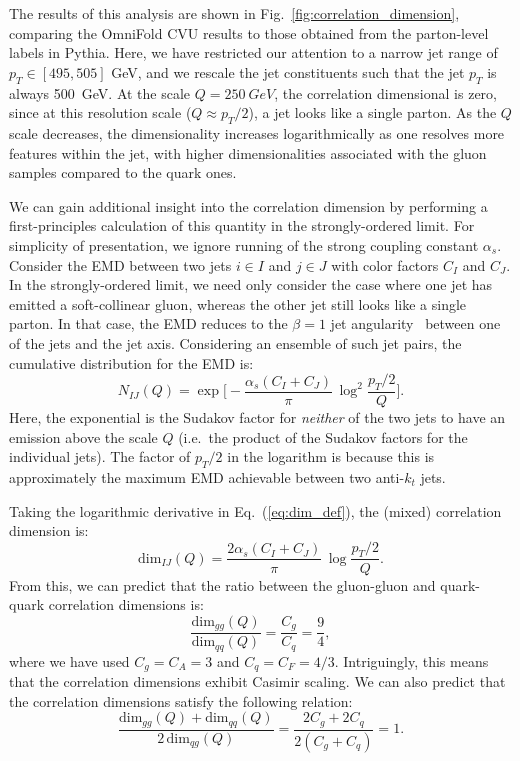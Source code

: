 \documentclass[aps,prd,twocolumn,preprintnumbers,nofootinbib,longbibliography,floatfix]{revtex4-1}
\DeclareRobustCommand{\Fig}[1]{Fig.~\ref{#1}}
\DeclareRobustCommand{\Eq}[1]{Eq.~(\ref{#1})}
\newcommand{\Pythia}{{\sc Pythia}\xspace}
\newcommand{\OmniFold}{{\sc OmniFold}\xspace}
\begin{document}
The results of this analysis are shown in \Fig{fig:correlation_dimension}, comparing the \OmniFold CVU results to those obtained from the parton-level labels in \Pythia.
%
Here, we have restricted our attention to a narrow jet range of $p_T \in [495,505]$ GeV, and we rescale the jet constituents such that the jet $p_T$ is always \SI{500}{GeV}. 
%
At the scale $Q = \SI{250}{GeV}$, the correlation dimensional is zero, since at this resolution scale ($Q \approx p_T/2$), a jet looks like a single parton.
%
As the $Q$ scale decreases, the dimensionality increases logarithmically as one resolves more features within the jet, with higher dimensionalities associated with the gluon samples compared to the quark ones.


We can gain additional insight into the correlation dimension by performing a first-principles calculation of this quantity in the strongly-ordered limit.
%
For simplicity of presentation, we ignore running of the strong coupling constant $\alpha_s$. 
%
Consider the EMD between two jets $i \in I$ and $j \in J$ with color factors $C_I$ and $C_J$.
%
In the strongly-ordered limit, we need only consider the case where one jet has emitted a soft-collinear gluon, whereas the other jet still looks like a single parton.
%
In that case, the EMD reduces to the $\beta = 1$ jet angularity~\cite{Ellis:2010rwa,Larkoski:2014uqa,Larkoski:2014pca} between one of the jets and the jet axis.
%
Considering an ensemble of such jet pairs, the cumulative distribution for the EMD is:
%
\begin{equation}
N_{IJ}(Q) = \exp \Big[- \frac{\alpha_s (C_I + C_J)}{\pi}\, \log^2 \frac{p_T/2}{Q}\Big].
\end{equation}
%
Here, the exponential is the Sudakov factor for \emph{neither} of the two jets to have an emission above the scale $Q$ (i.e.~the product of the Sudakov factors for the individual jets).
%
The factor of $p_T/ 2$ in the logarithm is because this is approximately the maximum EMD achievable between two anti-$k_t$ jets.


Taking the logarithmic derivative in \Eq{eq:dim_def}, the (mixed) correlation dimension is:
%
\begin{equation}
\label{eq:dim_QCD}
\text{dim}_{IJ}(Q) = \frac{2\alpha_s (C_I + C_J)}{\pi}\, \log \frac{p_T/2}{Q}.
\end{equation}
%
From this, we can predict that the ratio between the gluon-gluon and quark-quark correlation dimensions is:
%
\begin{equation}
\label{eq:dim_ratio}
\frac{\text{dim}_{gg}(Q)}{\text{dim}_{qq}(Q)} = \frac{C_g}{C_q} = \frac{9}{4},
\end{equation}
%
where we have used $C_g = C_A = 3$ and $C_q = C_F = 4/3$.
%
Intriguingly, this means that the correlation dimensions exhibit Casimir scaling.
%
We can also predict that the correlation dimensions satisfy the following relation:
%
\begin{equation}
\label{eq:dim_sum}
\frac{\text{dim}_{gg}(Q) + \text{dim}_{qq}(Q)}{2 \, \text{dim}_{qg}(Q)} = \frac{2 C_g + 2 C_q}{2 (C_g + C_q)} = 1.
\end{equation}
\end{document}
